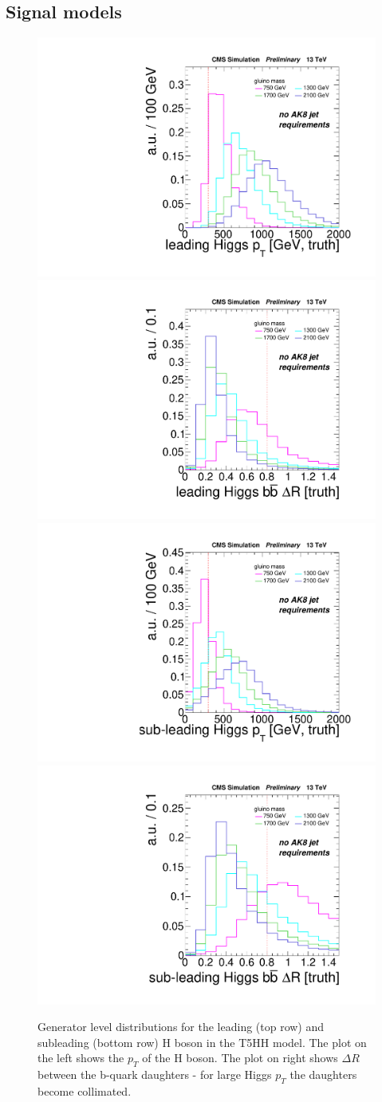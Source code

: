 \subsection{Signal models}
\label{sec:signal-models}

\begin{figure}[htbp!]
\centering
\includegraphics[width=0.45\linewidth]{figs/SUS17006/leadHiggsPt.pdf}
\includegraphics[width=0.45\linewidth]{figs/SUS17006/leadHiggsDr.pdf}\\
\includegraphics[width=0.45\linewidth]{figs/SUS17006/subleadHiggsPt.pdf}
\includegraphics[width=0.45\linewidth]{figs/SUS17006/subleadHiggsDr.pdf}\\
\caption{
Generator level distributions for the leading (top row) and subleading (bottom row) H boson in the T5HH model. The plot on the left shows the $p_{T}$ of the H boson. The plot on right shows $\Delta R$ between the b-quark daughters - for large Higgs $p_{T}$ the daughters become collimated.
}
\label{fig:GenHiggsBoost}
\end{figure}

